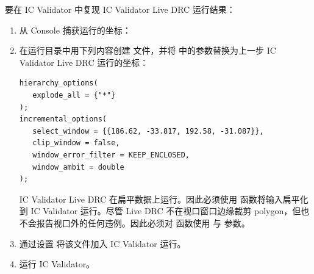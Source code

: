 要在 IC Validator 中复现 IC Validator Live DRC 运行结果：
\begin{enumerate}
  \item 从 Console 捕获运行的坐标：


  \item 在运行目录中用下列内容创建  文件，并将  中的参数替换为上一步 IC Validator Live DRC 运行的坐标：
\begin{lstlisting}[style=pxl]
hierarchy_options(
   explode_all = {"*"}
);
incremental_options(
   select_window = {{186.62, -33.817, 192.58, -31.087}},
   clip_window = false,
   window_error_filter = KEEP_ENCLOSED,
   window_ambit = double
);
\end{lstlisting}
  IC Validator Live DRC 在扁平数据上运行。因此必须使用  函数将输入扁平化到 IC Validator 运行。尽管 Live DRC 不在视口窗口边缘裁剪 polygon，但也不会报告视口外的任何违例。因此必须对  函数使用  与  参数。
  \item 通过设置  将该文件加入 IC Validator 运行。
  \item 运行 IC Validator。
\end{enumerate}
